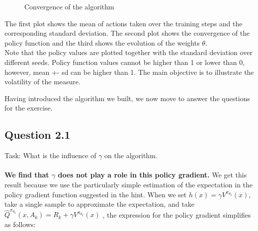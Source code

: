 \documentclass[a4paper, 11pt]{article} %
\begin{document}
   \begin{figure}[!htb]
        \caption{\label{fig:my-label} Convergence of the algorithm}
      \end{figure}

The first plot shows the mean of actions taken over the training steps and the corresponding standard deviation. The second plot shows the convergence of the policy function and the third shows the evolution of the weights $\theta$. \\

Note that the policy values are plotted together with the standard deviation over different seeds. Policy function values cannot be higher than 1 or lower than 0, however, mean +- sd can be higher than 1. The main objective is to illustrate the volatility of the measure.

Having introduced the algorithm we built, we now move to answer the questions for the exercise.

\subsection*{Question 2.1}

Task: What is the influence of $\gamma$ on the algorithm.
\\
\\
\textbf{We find that $\gamma$ does not play a role in this policy gradient.} We get this result because we use the particularly simple estimation of the expectation in the policy gradient function suggested in the hint. When we set $h(x)=\gamma V^{\pi_{\theta_{k}}}(x)$, take a single sample to approximate the expectation, and take $\widehat{Q}^{\pi_{\theta_{k}}}\left(x, A_{k}\right)=R_{k}+\gamma V^{\pi_{\theta_{k}}}(x)$ , the expression for the policy gradient simplifies as follows:
\end{document}
